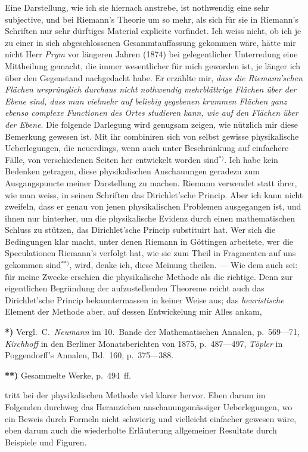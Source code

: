 \documentclass{article}
\begin{document}
Eine Darstellung, wie ich sie hiernach anstrebe, ist nothwendig eine sehr subjective, und bei Riemann's Theorie um so mehr, als sich für sie in Riemann's Schriften nur sehr dürftiges Material explicite vorfindet. Ich weiss nicht, ob ich je zu einer in sich abgeschlossenen Gesammtauffassung gekommen wäre, hätte mir nicht Herr \emph{Prym} vor längeren Jahren (1874) bei gelegentlicher Unterredung eine Mittheilung gemacht, die immer wesentlicher für mich geworden ist, je länger ich über den Gegenstand nachgedacht habe. Er erzählte mir, \emph{dass die Riemann'schen Flächen ursprünglich durchaus nicht nothwendig mehrblättrige Flächen über der Ebene sind, dass man vielmehr auf beliebig gegebenen krummen Flächen ganz ebenso complexe Functionen des Ortes studieren kann, wie auf den Flächen über der Ebene}. Die folgende Darlegung wird genugsam zeigen, wie nützlich mir diese Bemerkung gewesen ist. Mit ihr combiniren sich von selbst gewisse physikalische Ueberlegungen, die neuerdings, wenn auch unter Beschränkung auf einfachere Fälle, von verschiedenen Seiten her entwickelt worden sind${}^{*)}$. Ich habe kein Bedenken getragen, diese physikalischen Anschauungen geradezu zum Ausgangspuncte meiner Darstellung zu machen. Riemann verwendet statt ihrer, wie man weiss, in seinen Schriften das Dirichlet'sche Princip. Aber ich kann nicht zweifeln, dass er genau von jenen physikalischen Problemen ausgegangen ist, und ihnen nur hinterher, um die physikalische Evidenz durch einen mathematischen Schluss zu stützen, das Dirichlet'sche Princip substituirt hat. Wer sich die Bedingungen klar macht, unter denen Riemann in Göttingen arbeitete, wer die Speculationen Riemann's verfolgt hat, wie sie zum Theil in Fragmenten auf uns gekommen sind${}^{**)}$, wird, denke ich, diese Meinung theilen. --- Wie dem auch sei: für meine Zwecke erschien die physikalische Methode als die richtige. Denn zur eigentlichen Begründung der aufzustellenden Theoreme reicht auch das Dirichlet'sche Princip bekanntermassen in keiner Weise aus; das \emph{heuristische} Element der Methode aber, auf dessen Entwickelung mir Alles ankam,

\textbf{*)} Vergl.\ C.\ \emph{Neumann} im 10.~Bande der Mathematischen Annalen, p.~569---71, \emph{Kirchhoff} in den Berliner Monatsberichten von 1875, p.~487---497, \emph{Töpler} in Poggendorff's Annalen, Bd.~160, p.~375---388.

\textbf{**)} Gesammelte Werke, p.~494~ff.

tritt bei der physikalischen Methode viel klarer hervor. Eben darum im Folgenden durchweg das Heranziehen anschauungsmässiger Ueberlegungen, wo ein Beweis durch Formeln nicht schwierig und vielleicht einfacher gewesen wäre, eben darum auch die wiederholte Erläuterung allgemeiner Resultate durch Beispiele und Figuren.
\end{document}
